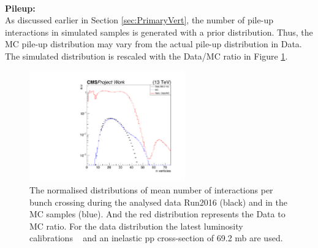 \\
\renewcommand{\arraystretch}{1}
\textbf{Pileup:}\\
As discussed earlier in Section \ref{sec:PrimaryVert}, the number of pile-up interactions in simulated samples is generated with a prior distribution. Thus, the MC pile-up distribution may vary from the actual pile-up distribution in Data. The simulated distribution is rescaled with the Data/MC ratio in Figure \ref{fig:pileUpmine}.
\begin{figure}[!hb]
  \includegraphics[width=0.6\textwidth]{Plots/analysis/pileUp/pileUp.pdf}
\centering
  \caption{\label{fig:pileUpmine} The normalised distributions of mean number of interactions per bunch crossing during the analysed data Run2016 (black) and in the MC samples (blue). And the red distribution represents the Data to MC ratio. For the data distribution the latest luminosity calibrations ~\cite{PileUp} and an inelastic pp cross-section of 69.2 mb are used. 
  }
\end{figure}\\
